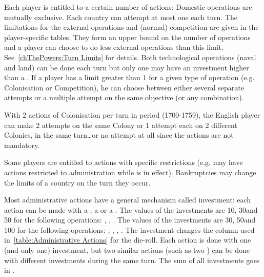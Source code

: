  \label{chAdministration:Administrative Limits} Each
player is entitled to a certain number of actions:
\bparag Domestic operations are mutually exclusive. Each country can attempt
at most one each turn.
\bparag The limitations for the external operations and (normal) competition
are given in the player-specific tables. They form an upper bound on the
number of operations and a player can choose to do less external operations
than this limit. See~\ref{chThePowers:Turn Limits} for details.
\bparag Both technological operations (naval and land) can be done each turn
but only one may have an investment higher than a .
\bparag If a player has a limit greater than 1 for a given type of operation
(e.g. Colonisation or Competition), he can choose between either several
separate attempts or a multiple attempt on the same objective (or any
combination).
\begin{exemple}
  With 2 actions of Colonisation per turn in period  (1700-1759),
  the English player can make 2 attempts on the same Colony or 1 attempt each
  on 2 different Colonies, in the same turn\ldots or no attempt at all since
  the actions are not mandatory.
\end{exemple}
\bparag Some players are entitled to actions with specific restrictions
(e.g. \SPA may have actions restricted to \POR administration while
 is in effect).
\bparag Bankruptcies may change the limits of a country on the turn they
occur.

\aparag[Investment] Most administrative actions have a general mechanism
called investment: each action can be made with a , a
 or a .
\bparag The values of the investments are 10\ducats, 30\ducats and 50\ducats
for the following operations: ,
, .
\bparag The values of the investments are 30\ducats, 50\ducats and 100\ducats
for the following operations: , , , .
\bparag The investment changes the column used in~\ref{table:Administrative
  Actions} for the die-roll. Each action is done with one (and only one)
investment, but two similar actions (such as two ) can be
done with different investments during the same turn.
\bparag The sum of all investments goes in .

